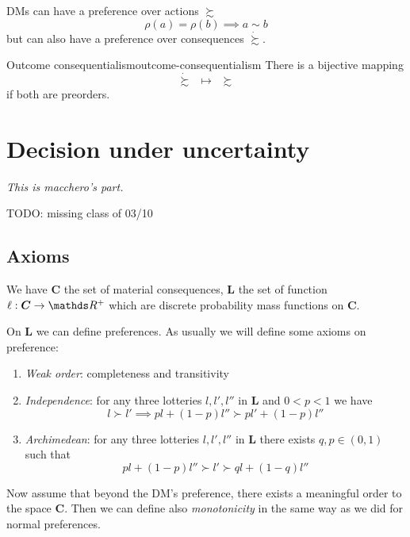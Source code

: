 \documentclass[12pt]{extarticle}
\begin{document}
DMs can have a preference over actions $\succsim$
\begin{equation}
	\rho(a) = \rho(b) \implies a \sim b
\end{equation}
but can also have a preference over consequences $\dot \succsim$.

\begin{theorem}{Outcome consequentialism}{outcome-consequentialism}
	There is a bijective mapping
	\begin{equation}
		\dot \succsim \enspace \mapsto \enspace \succsim
	\end{equation}
	if both are preorders.
\end{theorem}

\section{Decision under uncertainty}

\emph{This is macchero's part.}

TODO: missing class of 03/10

\subsection{Axioms}

We have $\bm C$ the set of material consequences, $\bm L$ the set of function $\ell: \bm C \to \R^+$ which are discrete probability mass functions on $\bm C$.

On $\bm L$ we can define preferences.
As usually we will define some axioms on preference:
\begin{enumerate}
	\item \emph{Weak order}: completeness and transitivity
	\item \emph{Independence}: for any three lotteries $l, l', l''$ in $\bm L$ and $0<p<1$ we have
	      \begin{equation}
		      l \succ l' \implies pl + (1-p) l'' \succ pl' + (1- p)l''
	      \end{equation}

	\item \emph{Archimedean}: for any three lotteries $l, l', l''$ in $\bm L$ there exists $q, p \in (0, 1)$ such that
	      \begin{equation}
		      pl + (1-p)l'' \succ l' \succ ql + (1-q)l''
	      \end{equation}
\end{enumerate}

Now assume that beyond the DM's preference, there exists a meaningful order to the space $\bm C$.
Then we can define also \emph{monotonicity} in the same way as we did for normal preferences.
\end{document}

